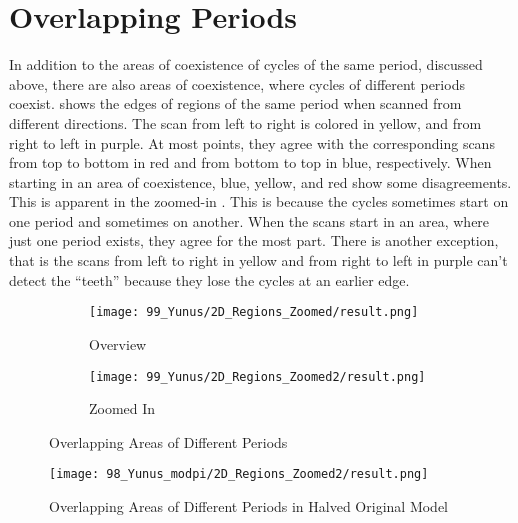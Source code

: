 \section{Overlapping Periods}

In addition to the areas of coexistence of cycles of the same period, discussed above, there are also areas of coexistence, where cycles of different periods coexist.
 shows the edges of regions of the same period when scanned from different directions.
The scan from left to right is colored in yellow, and from right to left in purple.
At most points, they agree with the corresponding scans from top to bottom in red and from bottom to top in blue, respectively.
When starting in an area of coexistence, blue, yellow, and red show some disagreements.
This is apparent in the zoomed-in .
This is because the cycles sometimes start on one period and sometimes on another.
When the scans start in an area, where just one period exists, they agree for the most part.
There is another exception, that is the scans from left to right in yellow and from right to left in purple can't detect the ``teeth'' because they lose the cycles at an earlier edge.

\begin{figure}
    \centering
    \begin{subfigure}{0.4\textwidth}
        \texttt{[image: 99\_Yunus/2D\_Regions\_Zoomed/result.png]}
        \caption{Overview}
        \label{fig:yunus.period.regions}
    \end{subfigure}
    \begin{subfigure}{0.4\textwidth}
        \texttt{[image: 99\_Yunus/2D\_Regions\_Zoomed2/result.png]}
        \caption{Zoomed In}
        \label{fig:yunus.period.regions.zoomed}
    \end{subfigure}
    \caption{Overlapping Areas of Different Periods}
\end{figure}

\begin{figure}
    \centering
    \texttt{[image: 98\_Yunus\_modpi/2D\_Regions\_Zoomed2/result.png]}
    \caption{Overlapping Areas of Different Periods in Halved Original Model}
    \label{fig:yunus.halved.period.regions.zoomed}
\end{figure}
